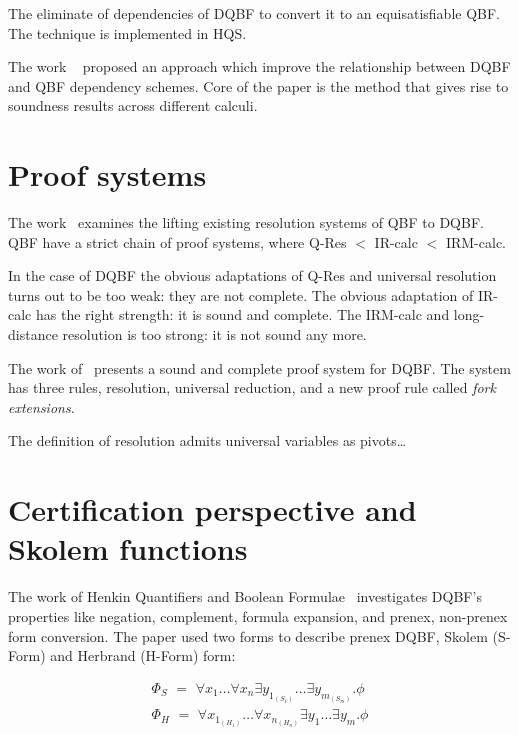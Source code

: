 \documentclass[runningheads]{llncs}
\begin{document}
The \cite{wimmer2017dqbf} eliminate of dependencies of DQBF to convert it to an equisatisfiable QBF.
%
The technique is implemented in HQS.



The work ~\cite{beyersdorff2018reinterpreting} proposed an approach which improve the relationship between DQBF and QBF
dependency schemes.
%
Core of the paper is the method that gives rise to soundness results across different calculi.

\section{Proof systems}
The work~\cite{beyersdorff2016lifting} examines the lifting existing resolution systems of QBF to DQBF.
%
QBF have a strict chain of proof systems, where Q-Res $<$ IR-calc $<$ IRM-calc.
%

In the case of DQBF the obvious adaptations of Q-Res and universal resolution turns out to be too weak: they are not complete.
%
The obvious adaptation of IR-calc has
the right strength: it is sound and complete.
%
The IRM-calc and long-distance resolution is too strong: it is not sound any more.

The work of~\cite{rabe2017resolution} presents a sound and complete proof system for DQBF.
%
The system has three rules, resolution, universal reduction, and a new proof rule called \textit{fork extensions}.

The definition of resolution admits universal variables as pivots\dots

\section{Certification perspective and Skolem functions}

The work of Henkin Quantifiers and Boolean Formulae~\cite{balabanov2012henkin} investigates DQBF's properties like negation, complement, formula expansion, and prenex, non-prenex form conversion.
%
The paper used two forms to describe prenex DQBF, Skolem (S-Form) and Herbrand (H-Form) form:

\begin{align}
\Phi_{S} \,\, = \,\, \forall x_{1}\dots \forall x_{n} \exists y_{1_{(S_{1})}}\dots\exists y_{m_{(S_{m})}} . \phi \label{eq1}\\
\Phi_{H}  \,\, = \,\, \forall x_{1_{(H_{1})}}\dots \forall x_{n_{(H_{n})}} \exists y_{1}\dots\exists y_{m} . \phi \label{eq2}
\end{align}
\end{document}
